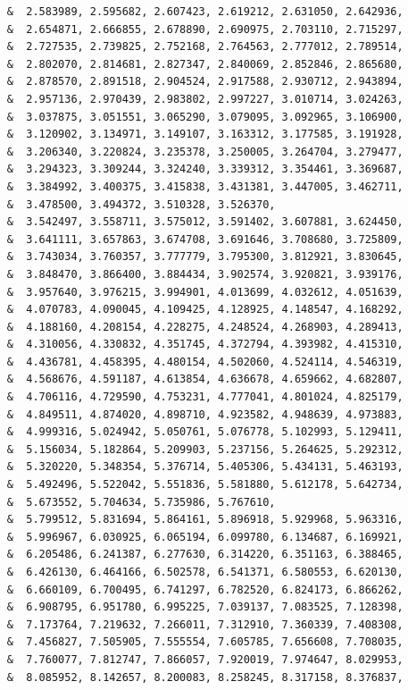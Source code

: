 \begin{lstlisting}
     &  2.583989, 2.595682, 2.607423, 2.619212, 2.631050, 2.642936,
     &  2.654871, 2.666855, 2.678890, 2.690975, 2.703110, 2.715297,
     &  2.727535, 2.739825, 2.752168, 2.764563, 2.777012, 2.789514,
     &  2.802070, 2.814681, 2.827347, 2.840069, 2.852846, 2.865680,
     &  2.878570, 2.891518, 2.904524, 2.917588, 2.930712, 2.943894,
     &  2.957136, 2.970439, 2.983802, 2.997227, 3.010714, 3.024263,
     &  3.037875, 3.051551, 3.065290, 3.079095, 3.092965, 3.106900,
     &  3.120902, 3.134971, 3.149107, 3.163312, 3.177585, 3.191928,
     &  3.206340, 3.220824, 3.235378, 3.250005, 3.264704, 3.279477,
     &  3.294323, 3.309244, 3.324240, 3.339312, 3.354461, 3.369687,
     &  3.384992, 3.400375, 3.415838, 3.431381, 3.447005, 3.462711,
     &  3.478500, 3.494372, 3.510328, 3.526370,
     &  3.542497, 3.558711, 3.575012, 3.591402, 3.607881, 3.624450,
     &  3.641111, 3.657863, 3.674708, 3.691646, 3.708680, 3.725809,
     &  3.743034, 3.760357, 3.777779, 3.795300, 3.812921, 3.830645,
     &  3.848470, 3.866400, 3.884434, 3.902574, 3.920821, 3.939176,
     &  3.957640, 3.976215, 3.994901, 4.013699, 4.032612, 4.051639,
     &  4.070783, 4.090045, 4.109425, 4.128925, 4.148547, 4.168292,
     &  4.188160, 4.208154, 4.228275, 4.248524, 4.268903, 4.289413,
     &  4.310056, 4.330832, 4.351745, 4.372794, 4.393982, 4.415310,
     &  4.436781, 4.458395, 4.480154, 4.502060, 4.524114, 4.546319,
     &  4.568676, 4.591187, 4.613854, 4.636678, 4.659662, 4.682807,
     &  4.706116, 4.729590, 4.753231, 4.777041, 4.801024, 4.825179,
     &  4.849511, 4.874020, 4.898710, 4.923582, 4.948639, 4.973883,
     &  4.999316, 5.024942, 5.050761, 5.076778, 5.102993, 5.129411,
     &  5.156034, 5.182864, 5.209903, 5.237156, 5.264625, 5.292312,
     &  5.320220, 5.348354, 5.376714, 5.405306, 5.434131, 5.463193,
     &  5.492496, 5.522042, 5.551836, 5.581880, 5.612178, 5.642734,
     &  5.673552, 5.704634, 5.735986, 5.767610,
     &  5.799512, 5.831694, 5.864161, 5.896918, 5.929968, 5.963316,
     &  5.996967, 6.030925, 6.065194, 6.099780, 6.134687, 6.169921,
     &  6.205486, 6.241387, 6.277630, 6.314220, 6.351163, 6.388465,
     &  6.426130, 6.464166, 6.502578, 6.541371, 6.580553, 6.620130,
     &  6.660109, 6.700495, 6.741297, 6.782520, 6.824173, 6.866262,
     &  6.908795, 6.951780, 6.995225, 7.039137, 7.083525, 7.128398,
     &  7.173764, 7.219632, 7.266011, 7.312910, 7.360339, 7.408308,
     &  7.456827, 7.505905, 7.555554, 7.605785, 7.656608, 7.708035,
     &  7.760077, 7.812747, 7.866057, 7.920019, 7.974647, 8.029953,
     &  8.085952, 8.142657, 8.200083, 8.258245, 8.317158, 8.376837,

\end{lstlisting}
